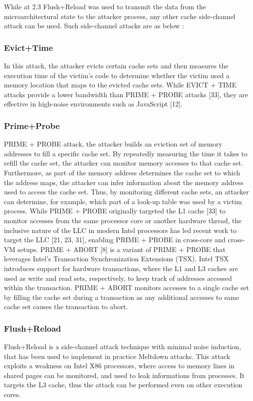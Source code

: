 \documentclass[sigconf]{acmart}
\begin{document}
While at 2.3 Flush+Reload was used to transmit the data from the microarchitectural state to the attacker process, any other cache side-channel attack can be used. Such side-channel attacks are as below : \cite{8686667}

\subsubsection{Evict+Time}

In this attack, the attacker evicts certain cache sets and then measures the execution time of the victim’s code to determine whether the victim used a memory location that maps to the
evicted cache sets. While EVICT + TIME attacks provide a lower bandwidth than PRIME + PROBE attacks [33], they are effective in high-noise environments such as JavaScript [12].

\subsubsection{Prime+Probe}

PRIME + PROBE attack, the attacker builds an eviction set of memory addresses to fill a specific cache set. By repeatedly measuring the time it takes to refill the cache
set, the attacker can monitor memory accesses to that cache set. Furthermore, as part of the memory address determines the cache set to which the address maps, the attacker can infer information about the memory address used to access the cache set. Thus, by monitoring different cache sets, an attacker can determine, for example, which part of a look-up table was used by a victim process. While PRIME + PROBE originally targeted the L1 cache [33] to monitor accesses from the same processor core or another hardware thread, the inclusive nature of
the LLC in modern Intel processors has led recent work to target the LLC [21, 23, 31], enabling PRIME + PROBE in cross-core and cross-VM setups.
PRIME + ABORT [8] is a variant of PRIME + PROBE that leverages Intel’s Transaction Synchronization Extensions (TSX). Intel TSX introduces support for hardware transactions, where the L1 and L3 caches are used as write and read sets, respectively, to keep track of addresses accessed within the transaction. PRIME + ABORT monitors accesses to a single cache set by filling the cache set during a transaction as any additional accesses to same cache set causes the transaction to abort.

\subsubsection{Flush+Reload}
Flush+Reload\cite{Knuth97} is a side-channel attack technique with minimal noise induction, that has been used to implement in practice Meltdown attacks. This attack exploits a weakness on Intel X86 processors, where access to memory lines in shared pages can be monitored, and used to leak informations from processes. It targets the L3 cache, thus the attack can be performed even on other execution cores. 
\end{document}
